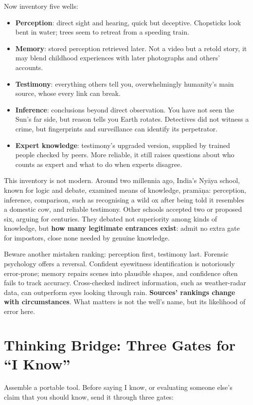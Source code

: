 Now inventory five wells:

\begin{itemize}
\item \textbf{Perception}: direct sight and hearing, quick but deceptive. Chopsticks look bent in water; trees seem to retreat from a speeding train.
\item \textbf{Memory}: stored perception retrieved later. Not a video but a retold story, it may blend childhood experiences with later photographs and others' accounts.
\item \textbf{Testimony}: everything others tell you, overwhelmingly humanity's main source, whose every link can break.
\item \textbf{Inference}: conclusions beyond direct observation. You have not seen the Sun's far side, but reason tells you Earth rotates. Detectives did not witness a crime, but fingerprints and surveillance can identify its perpetrator.
\item \textbf{Expert knowledge}: testimony's upgraded version, supplied by trained people checked by peers. More reliable, it still raises questions about who counts as expert and what to do when experts disagree.
\end{itemize}
This inventory is not modern. Around two millennia ago, India's Nyāya school, known for logic and debate, examined means of knowledge, pramāṇa: perception, inference, comparison, such as recognising a wild ox after being told it resembles a domestic cow, and reliable testimony. Other schools accepted two or proposed six, arguing for centuries. They debated not superiority among kinds of knowledge, but \textbf{how many legitimate entrances exist}: admit no extra gate for impostors, close none needed by genuine knowledge.

Beware another mistaken ranking: perception first, testimony last. Forensic psychology offers a reversal. Confident eyewitness identification is notoriously error-prone; memory repairs scenes into plausible shapes, and confidence often fails to track accuracy. Cross-checked indirect information, such as weather-radar data, can outperform eyes looking through rain. \textbf{Sources' rankings change with circumstances}. What matters is not the well's name, but its likelihood of error here.

\section[Thinking Bridge: Three Gates]{Thinking Bridge: Three Gates for ``I Know''}
Assemble a portable tool. Before saying I know, or evaluating someone else's claim that you should know, send it through three gates:

